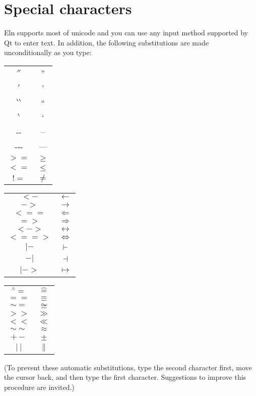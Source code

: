 \documentclass[11pt]{report}
\begin{document}
\section{Special characters}

Eln supports most of unicode and you can use any input method
supported by Qt to enter text. In addition, the following
substitutions are made unconditionally as you type:
\begin{multicols}{3}
\begin{tabular}{cc}
$''$ & '' \\
$'$ & ' \\
$\backprime\backprime$ & `` \\
$\backprime$ & ` \\
-{}- & -- \\
-{}-{}- & --- \\
$>=$ & $\geq$ \\
$<=$ & $\leq$ \\
$!=$ & $\neq$ 
\end{tabular}

\begin{tabular}{cc}
$<$$-$ & $\leftarrow$ \\
$-$$>$ & $\rightarrow$ \\
$<==$ & $\Leftarrow$ \\
$=>$ & $\Rightarrow$ \\
$<$$-$$>$ & $\leftrightarrow$ \\
$<==>$ & $\Leftrightarrow$ \\
$|-$ & $\vdash$ \\
$-|$ & $\dashv$ \\
$|-$$>$ & $\mapsto$ \\
\end{tabular}

\begin{tabular}{cc}
$^\wedge{}=$ & $\hat=$ \\
$==$ & $\equiv$ \\
$\sim=$ & $\cong$ \\
$>>$ & $\gg$ \\
$<<$ & $\ll$ \\
$\sim\sim$ & $\approx$ \\
$+-$ & $\pm$ \\
$|~|$ & $ \parallel $ \\
\end{tabular}

\end{multicols}

\noindent (To prevent these automatic substitutions, type the second character
first, move the cursor back, and then type the first
character. Suggestions to improve this procedure are invited.)
\end{document}
